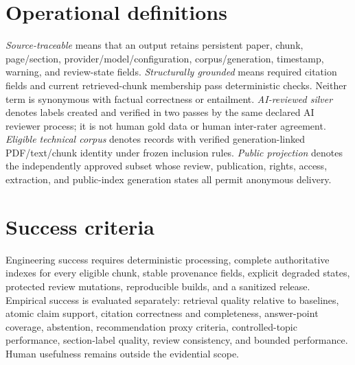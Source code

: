 \section{Operational definitions}

\emph{Source-traceable} means that an output retains persistent paper, chunk, page/section, provider/model/configuration, corpus/generation, timestamp, warning, and review-state fields. \emph{Structurally grounded} means required citation fields and current retrieved-chunk membership pass deterministic checks. Neither term is synonymous with factual correctness or entailment. \emph{AI-reviewed silver} denotes labels created and verified in two passes by the same declared AI reviewer process; it is not human gold data or human inter-rater agreement. \emph{Eligible technical corpus} denotes records with verified generation-linked PDF/text/chunk identity under frozen inclusion rules. \emph{Public projection} denotes the independently approved subset whose review, publication, rights, access, extraction, and public-index generation states all permit anonymous delivery.

\section{Success criteria}

Engineering success requires deterministic processing, complete authoritative indexes for every eligible chunk, stable provenance fields, explicit degraded states, protected review mutations, reproducible builds, and a sanitized release. Empirical success is evaluated separately: retrieval quality relative to baselines, atomic claim support, citation correctness and completeness, answer-point coverage, abstention, recommendation proxy criteria, controlled-topic performance, section-label quality, review consistency, and bounded performance. Human usefulness remains outside the evidential scope.
